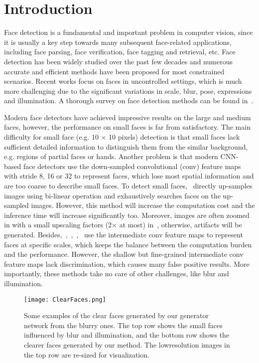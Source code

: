 \documentclass[10pt,twocolumn,letterpaper]{article}
\begin{document}
\section{Introduction}
Face detection is a fundamental and important problem
in computer vision, since it is usually a key step towards
many subsequent face-related applications, including
face parsing, face verification, face tagging and retrieval,
etc. Face detection has been widely studied over the past
few decades and numerous accurate and efficient methods
have been proposed for most constrained scenarios. Recent works focus on faces in uncontrolled settings, which is
much more challenging due to the significant variations in
scale, blur, pose, expressions and illumination. A thorough
survey on face detection methods can be found in~\cite{Zafeiriou2015A}.\par
Modern face detectors have achieved impressive results
on the large and medium faces, however, the performance
on small faces is far from satisfactory. The main difficulty
for small face (e.g. 10 $\times$ 10 pixels) detection is that small
faces lack sufficient detailed information to distinguish
them from the similar background, e.g. regions of partial
faces or hands. Another problem is that modern CNN-based
face detectors use the down-sampled convolutional (conv)
feature maps with stride 8, 16 or 32 to represent faces,
which lose most spatial information and are too coarse to
describe small faces. To detect small faces,~\cite{Xu2017Learning} directly
up-samples images using bi-linear operation and exhaustively
searches faces on the up-sampled images. However,
this method will increase the computation cost and the
inference time will increase significantly too. Moreover,
images are often zoomed in with a small upscaling factors
(2× at most) in~\cite{Xu2017Learning}, otherwise, artifacts will be generated.
Besides,~\cite{Bai2017Multi},~\cite{Jiang_2017_Det},~\cite{WanCZZW16},~\cite{ZhuZLS16} use the intermediate conv feature
maps to represent faces at specific scales, which keeps
the balance between the computation burden and the performance.
However, the shallow but fine-grained intermediate
conv feature maps lack discrimination, which causes many
false positive results. More importantly, these methods take
no care of other challenges, like blur and illumination.\par

\begin{figure}[!htb]
\begin{center}
   \texttt{[image: ClearFaces.png]}
\end{center}
   \caption{Some examples of the clear faces generated by our generator
network from the blurry ones. The top row shows the small
faces influenced by blur and illumination, and the bottom
row shows the clearer faces generated by our method. The lowresolution
images in the top row are re-sized for visualization.}
\label{fig:questions}
\end{figure}
\end{document}
